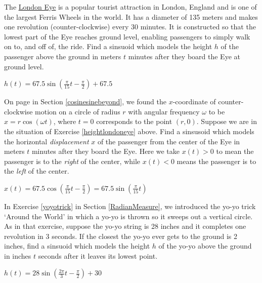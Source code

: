 \documentclass{ximera}
\begin{document}
\begin{problem} \label{heightlondoneye} 
The \href{http://en.wikipedia.org/wiki/London_Eye}{\underline{London Eye}} is a popular tourist attraction in London, England and is one of the largest Ferris Wheels in the world.  It has a diameter of 135 meters and makes one revolution (counter-clockwise) every 30 minutes.  It is constructed so that the lowest part of the Eye reaches ground level, enabling passengers to simply walk on to, and off of, the ride.  Find a sinsuoid which models the height $h$ of the passenger above the ground in meters $t$ minutes after they board the Eye at ground level.

\begin{solution}
    $h(t) = 67.5 \sin\left(\frac{\pi}{15} t - \frac{\pi}{2} \right) + 67.5$
\end{solution}
\end{problem}

\begin{problem} \label{leftrightlondoneye} 
On page \pageref{equationsforcircularmotion} in Section \ref{cosinesinebeyond}, we found the $x$-coordinate of counter-clockwise motion on a circle of radius $r$ with angular frequency $\omega$ to be $x = r\cos(\omega t)$, where $t=0$ corresponds to the point $(r,0)$.  Suppose we are in the situation of Exercise \ref{heightlondoneye} above.  Find a sinsusoid which models the horizontal \textit{displacement} $x$ of the passenger from the center of the Eye in meters $t$ minutes after they board the Eye.  Here we take $x(t) > 0$ to mean the passenger is to the \textit{right} of the center, while $x(t) < 0$ means the passenger is to the \textit{left} of the center.

\begin{solution}
    $x(t) = 67.5 \cos\left(\frac{\pi}{15} t - \frac{\pi}{2} \right) = 67.5 \sin\left(\frac{\pi}{15} t \right)$
\end{solution}
\end{problem}

\begin{problem}
In Exercise \ref{yoyotrick} in Section \ref{RadianMeasure}, we introduced the yo-yo trick `Around the World' in which a yo-yo is thrown so it sweeps out a vertical circle.  As in that exercise, suppose the yo-yo string is 28 inches and it completes one revolution in 3 seconds.  If the closest the yo-yo ever gets to the ground is 2 inches, find a sinsuoid which models the height $h$ of the yo-yo above the ground in inches $t$ seconds after it leaves its lowest point.

\begin{solution}
    $h(t) = 28\sin\left(\frac{2\pi}{3} t - \frac{\pi}{2}\right) + 30$
\end{solution}
\end{problem}
\end{document}
